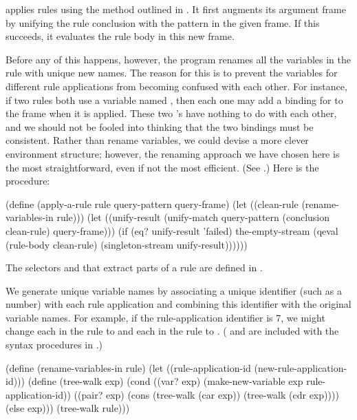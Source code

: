 \noindent
{} applies rules using the method outlined in
.  It first augments its argument frame by unifying the rule
conclusion with the pattern in the given frame.  If this succeeds, it evaluates
the rule body in this new frame.

Before any of this happens, however, the program renames all the variables in
the rule with unique new names.  The reason for this is to prevent the
variables for different rule applications from becoming confused with each
other.  For instance, if two rules both use a variable named , then
each one may add a binding for  to the frame when it is applied.
These two 's have nothing to do with each other, and we should not be
fooled into thinking that the two bindings must be consistent.  Rather than
rename variables, we could devise a more clever environment structure; however,
the renaming approach we have chosen here is the most straightforward, even if
not the most efficient.  (See .)  Here is the
 procedure:

\begin{codeBlock}
(define (apply-a-rule rule query-pattern query-frame)
  (let ((clean-rule (rename-variables-in rule)))
    (let ((unify-result (unify-match query-pattern
                                     (conclusion clean-rule)
                                     query-frame)))
      (if (eq? unify-result 'failed)
          the-empty-stream
          (qeval (rule-body clean-rule)
                 (singleton-stream unify-result))))))
\end{codeBlock}

\noindent
The selectors  and  that extract parts of a
rule are defined in .

We generate unique variable names by associating a unique identifier (such as a
number) with each rule application and combining this identifier with the
original variable names.  For example, if the rule-application identifier is 7,
we might change each  in the rule to  and each  in
the rule to .  ( and
 are included with the syntax procedures in
.)

\begin{codeBlock}
(define (rename-variables-in rule)
  (let ((rule-application-id (new-rule-application-id)))
    (define (tree-walk exp)
      (cond ((var? exp)
             (make-new-variable exp rule-application-id))
            ((pair? exp)
             (cons (tree-walk (car exp))
                   (tree-walk (cdr exp))))
            (else exp)))
    (tree-walk rule)))
\end{codeBlock}

